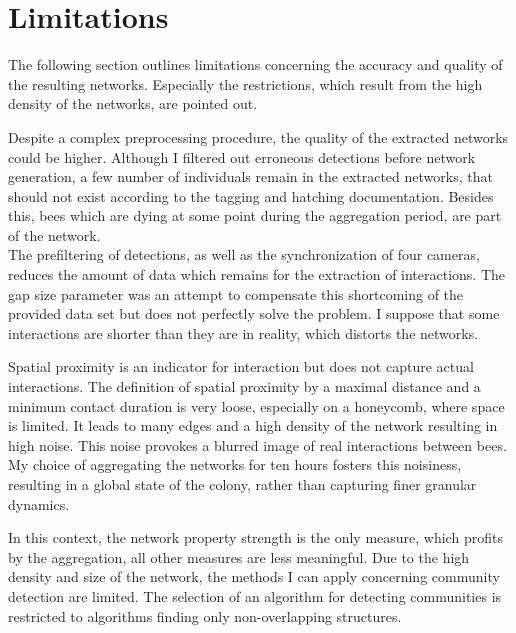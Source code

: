 \section{Limitations}
The following section outlines limitations concerning the accuracy and quality of the resulting networks. Especially the restrictions, which result from the high density of the networks, are pointed out.

Despite a complex preprocessing procedure, the quality of the extracted networks could be higher. Although I filtered out erroneous detections before network generation, a few number of individuals remain in the extracted networks, that should not exist according to the tagging and hatching documentation. Besides this, bees which are dying at some point during the aggregation period, are part of the network.\\
The prefiltering of detections, as well as the synchronization of four cameras, reduces the amount of data which remains for the extraction of interactions. The gap size parameter was an attempt to compensate this shortcoming of the provided data set but does not perfectly solve the problem. I suppose that some interactions are shorter than they are in reality, which distorts the networks.

Spatial proximity is an indicator for interaction but does not capture actual interactions. The definition of spatial proximity by a maximal distance and a minimum contact duration is very loose, especially on a honeycomb, where space is limited. It leads to many edges and a high density of the network resulting in high noise. This noise provokes a blurred image of real interactions between bees. My choice of aggregating the networks for ten hours fosters this noisiness, resulting in a global state of the colony, rather than capturing finer granular dynamics.

In this context, the network property strength is the only measure, which profits by the aggregation, all other measures are less meaningful. Due to the high density and size of the network, the methods I can apply concerning community detection are limited. The selection of an algorithm for detecting communities is restricted to algorithms finding only non-overlapping structures.

